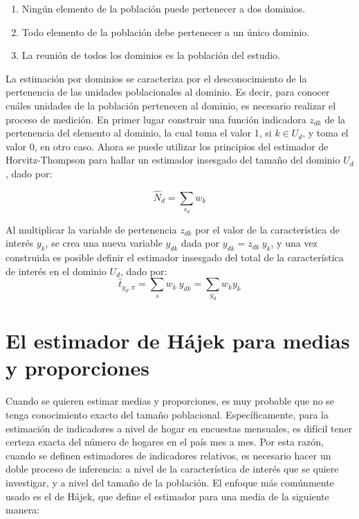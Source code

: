 \documentclass[
  10pt,
  spanish,
]{book}
\providecommand{\tightlist}{%
  \setlength{\itemsep}{0pt}\setlength{\parskip}{0pt}}
\begin{document}
\begin{enumerate}
\def\labelenumi{\arabic{enumi}.}
\tightlist
\item
  Ningún elemento de la población puede pertenecer a dos dominios.
\item
  Todo elemento de la población debe pertenecer a un único dominio.
\item
  La reunión de todos los dominios es la población del estudio.
\end{enumerate}

La estimación por dominios se caracteriza por el desconocimiento de la pertenencia de las unidades poblacionales al dominio. Es decir, para conocer cuáles unidades de la población pertenecen al dominio, es necesario realizar el proceso de medición. En primer lugar construir una función indicadora \(z_{dk}\) de la pertenencia del elemento al dominio, la cual toma el valor 1, si \(k\in U_d\), y toma el valor 0, en otro caso. Ahora se puede utilizar los principios del estimador de Horvitz-Thompson para hallar un estimador insesgado del tamaño del dominio \(U_d\), dado por:

\[
\hat{N}_d = \sum_{s_d} w_k 
\]

Al multiplicar la variable de pertenencia \(z_{dk}\) por el valor de la característica de interés \(y_k\), se crea una nueva variable \(y_{dk}\) dada por \(y_{dk}=z_{dk} \ y_k\), y una vez construida es posible definir el estimador insesgado del total de la característica de interés en el dominio \(U_d\), dado por:
\[
\hat{t}_{y_d,\pi}=\sum_sw_k\ y_{dk}=\sum_{S_d}w_ky_k
\]

\hypertarget{el-estimador-de-huxe1jek-para-medias-y-proporciones}{%
\section{El estimador de Hájek para medias y proporciones}\label{el-estimador-de-huxe1jek-para-medias-y-proporciones}}

Cuando se quieren estimar medias y proporciones, es muy probable que no se tenga conocimiento exacto del tamaño poblacional. Específicamente, para la estimación de indicadores a nivel de hogar en encuestas mensuales, es difícil tener certeza exacta del número de hogares en el país mes a mes. Por esta razón, cuando se definen estimadores de indicadores relativos, es necesario hacer un doble proceso de inferencia: a nivel de la característica de interés que se quiere investigar, y a nivel del tamaño de la población. El enfoque más comúnmente usado es el de Hájek, que define el estimador para una media de la siguiente manera:
\end{document}
